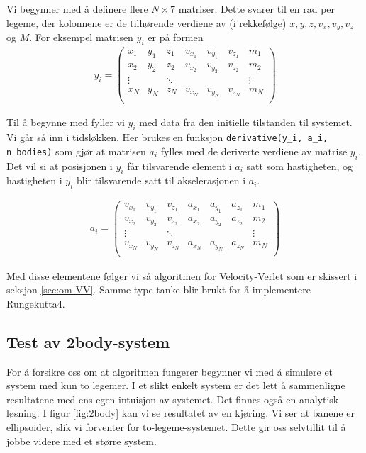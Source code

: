\documentclass[11pt]{article}
\begin{document}
\begin{multicols}{2}
Vi begynner med å definere flere $N\times 7$ matriser. Dette svarer til
en rad per legeme, der kolonnene er de tilhørende verdiene av (i rekkefølge) $x,y,z,v_x,v_y,v_z$
og $M$. For eksempel matrisen $y_i$ er på formen
\begin{align*}
  y_i = \begin{pmatrix}
    x_1&y_1&z_1&v_{x_1}&v_{y_1} &v_{z_1} & m_1\\
    x_2&y_2&z_2&v_{x_2}&v_{y_2} &v_{z_2} & m_2\\
    \vdots&&\ddots&&&&\vdots\\
    x_N&y_N&z_N&v_{x_N}&v_{y_N} &v_{z_N} & m_N\\
  \end{pmatrix}
\end{align*}

Til å begynne med fyller vi $y_i$ med data fra den initielle tilstanden til systemet.
Vi går så inn i tidsløkken. Her brukes en funksjon
\texttt{derivative(y\_i, a\_i, n\_bodies)} som gjør at matrisen $a_i$ fylles med de
deriverte verdiene av matrise $y_i$. Det vil si at posisjonen i $y_i$
får tilsvarende element i $a_i$ satt som hastigheten, og hastigheten i
$y_i$ blir tilsvarende satt til akselerasjonen i $a_i$. 

\begin{align*}
  a_i = \begin{pmatrix}
    v_{x_1}&v_{y_1} &v_{z_1}&a_{x_1}&a_{y_1} &a_{z_1} & m_1\\
    v_{x_2}&v_{y_2} &v_{z_2}&a_{x_2}&a_{y_2} &a_{z_2} & m_2\\
    \vdots&&\ddots&&&&\vdots\\
    v_{x_N}&v_{y_N} &v_{z_N}&a_{x_N}&a_{y_N} &a_{z_N} & m_N\\
  \end{pmatrix}
\end{align*}

Med disse elementene følger vi så algoritmen for Velocity-Verlet som
er skissert i seksjon \ref{sec:om-VV}. Samme type tanke blir brukt for
å implementere Rungekutta4.


\subsection{Test av 2body-system}
For å forsikre oss om at algoritmen fungerer begynner vi med å simulere
et system med kun to legemer. I et slikt enkelt system er det lett å 
sammenligne resultatene med ens egen intuisjon av systemet. Det finnes
også en analytisk løsning. I figur \ref{fig:2body} kan vi se resultatet 
av en kjøring. Vi ser at banene er ellipsoider, slik vi forventer for
to-legeme-systemet. Dette gir oss selvtillit til å jobbe videre
med et større system.

\end{multicols}
\end{document}
